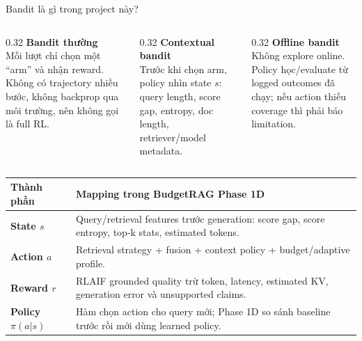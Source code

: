 \documentclass[aspectratio=169,10pt]{beamer}
\newcommand{\minihead}[1]{{\bfseries\color{AccentDark}#1}}
\begin{document}
\begin{frame}{Bandit là gì trong project này?}
  \small
  \begin{columns}[T,onlytextwidth]
    \begin{column}{0.32\textwidth}
      \minihead{Bandit thường}\\
      \color{Muted}Mỗi lượt chỉ chọn một ``arm'' và nhận reward. Không có trajectory nhiều bước, không backprop qua môi trường, nên không gọi là full RL.
    \end{column}
    \begin{column}{0.32\textwidth}
      \minihead{Contextual bandit}\\
      \color{Muted}Trước khi chọn arm, policy nhìn state \(s\): query length, score gap, entropy, doc length, retriever/model metadata.
    \end{column}
    \begin{column}{0.32\textwidth}
      \minihead{Offline bandit}\\
      \color{Muted}Không explore online. Policy học/evaluate từ logged outcomes đã chạy; nếu action thiếu coverage thì phải báo limitation.
    \end{column}
  \end{columns}

  \vspace{0.34cm}
  \scriptsize
  \renewcommand{\arraystretch}{1.16}
  \begin{tabular}{>{\bfseries}p{}p{}}
    \toprule
    Thành phần & Mapping trong BudgetRAG Phase 1D \\
    \midrule
    State \(s\) & Query/retrieval features trước generation: score gap, score entropy, top-k stats, estimated tokens. \\
    Action \(a\) & Retrieval strategy + fusion + context policy + budget/adaptive profile. \\
    Reward \(r\) & RLAIF grounded quality trừ token, latency, estimated KV, generation error và unsupported claims. \\
    Policy \(\pi(a|s)\) & Hàm chọn action cho query mới; Phase 1D so sánh baseline trước rồi mới dùng learned policy. \\
    \bottomrule
  \end{tabular}
\end{frame}
\end{document}
